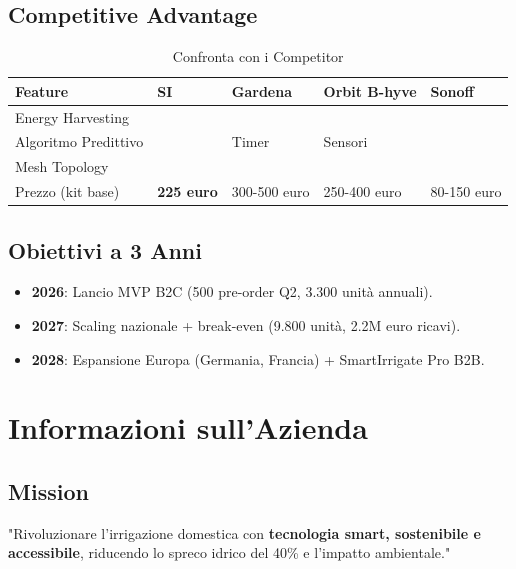 \documentclass[11pt,a4paper]{report}
\newcommand{\checkmarkbold}{\textbf{\checkmark}}
\newcommand{\crossbold}{\textbf{\texttimes}}
\begin{document}
\section{Competitive Advantage}
\begin{table}[H]
\centering
\caption{Confronta con i Competitor}
\label{tab:competitive-advantage}
\begin{tabular}{L{3cm} C{1.5cm} L{3cm} L{3cm} L{2.5cm}}
\toprule
{\bf Feature} & {\bf SI} & {\bf Gardena} & {\bf Orbit B-hyve} & {\bf Sonoff} \\
\midrule
Energy Harvesting & \checkmarkbold & \crossbold & \crossbold & \crossbold \\
Algoritmo Predittivo & \checkmarkbold & \crossbold Timer & \crossbold Sensori & \crossbold \\
Mesh Topology & \checkmarkbold & \crossbold & \crossbold & \crossbold \\
Prezzo (kit base) & {\bf 225 euro} & 300-500 euro & 250-400 euro & 80-150 euro \\
\bottomrule
\end{tabular}
\end{table}

\section{Obiettivi a 3 Anni}
\begin{itemize}
\item {\bf 2026}: Lancio MVP B2C (500 pre-order Q2, 3.300 unità annuali).
\item {\bf 2027}: Scaling nazionale + break-even (9.800 unità, 2.2M euro ricavi).
\item {\bf 2028}: Espansione Europa (Germania, Francia) + SmartIrrigate Pro B2B.
\end{itemize}

\chapter{Informazioni sull'Azienda}
\label{ch:company-overview}

\section{Mission}
"Rivoluzionare l'irrigazione domestica con {\bf tecnologia smart, sostenibile e accessibile}, riducendo lo spreco idrico del 40\% e l'impatto ambientale."
\end{document}
